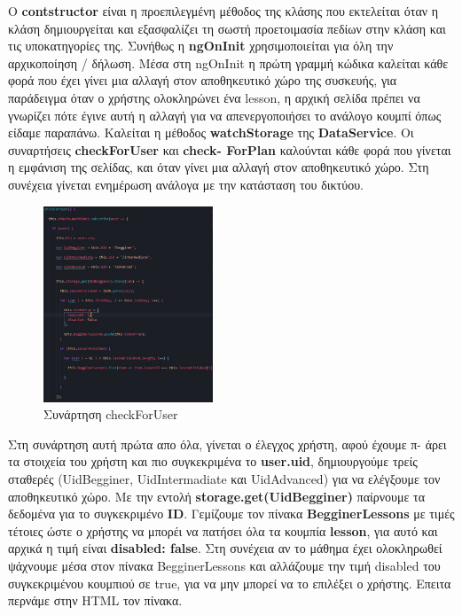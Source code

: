 \documentclass[a4paper,12pt]{article}
\begin{document}
			Ο \textbf{contstructor} είναι η προεπιλεγμένη μέθοδος της κλάσης που εκτελείται όταν η κλάση δημιουργείται και εξασφαλίζει τη σωστή προετοιμασία πεδίων στην κλάση και τις υποκατηγορίες της.
			Συνήθως η \textbf{ngOnInit} χρησιμοποιείται για όλη την αρχικοποίηση / δήλωση. Μέσα στη ngOnInit η πρώτη γραμμή κώδικα καλείται κάθε φορά που έχει γίνει μια αλλαγή στον αποθηκευτικό χώρο της συσκευής, για παράδειγμα όταν ο χρήστης ολοκληρώνει ένα lesson, η αρχική σελίδα πρέπει να γνωρίζει πότε έγινε αυτή η αλλαγή για να απενεργοποιήσει το ανάλογο κουμπί όπως είδαμε παραπάνω. Καλείται η
			μέθοδος \textbf{watchStorage} της \textbf{DataService}. Οι συναρτήσεις \textbf{checkForUser} και \textbf{check-
			ForPlan} καλούνται κάθε φορά που γίνεται η εμφάνιση της σελίδας, και όταν γίνει μια αλλαγή στον αποθηκευτικό χώρο. Στη συνέχεια γίνεται ενημέρωση ανάλογα με την κατάσταση του δικτύου.

			\newpage
			\begin{figure}
				
				\caption{Συνάρτηση checkForUser}
				\vspace*{0.5cm}

				\includegraphics[width=0.45\textwidth]{checkUser}	
			\end{figure}

			Στη συνάρτηση αυτή πρώτα απο όλα, γίνεται ο έλεγχος χρήστη, αφού έχουμε π-
			άρει τα στοιχεία του χρήστη και πιο συγκεκριμένα το \textbf{user.uid}, δημιουργούμε τρείς σταθερές (UidBegginer, UidIntermadiate και UidAdvanced) για να ελέγξουμε τον αποθηκευτικό χώρο. Με την εντολή \newline
			\textbf{storage.get(UidBegginer)} παίρνουμε τα δεδομένα για το συγκεκριμένο \textbf{ID}. Γεμίζουμε τον πίνακα \textbf{BegginerLessons} με τιμές τέτοιες ώστε ο χρήστης να μπορέι να πατήσει
			 όλα τα κουμπία \textbf{lesson}, για αυτό και αρχικά η τιμή είναι \textbf{disabled: false}. Στη συνέχεια αν το μάθημα έχει ολοκληρωθεί ψάχνουμε μέσα στον πίνακα BegginerLessons και αλλάζουμε την τιμή disabled του συγκεκριμένου κουμπιού σε true, για να μην μπορεί να το επιλέξει ο χρήστης. Επειτα περνάμε στην HTML τον πίνακα.
\end{document}
